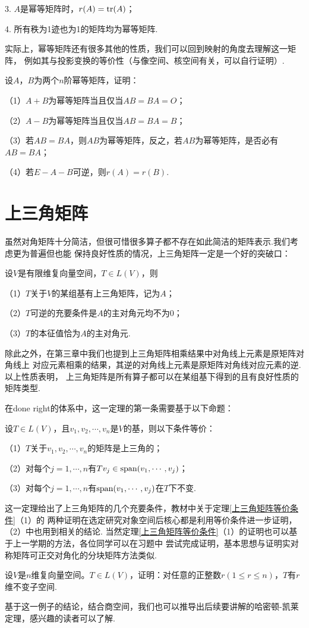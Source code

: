 3. $A$是幂等矩阵时，$r(A)=\textup{tr}(A)$；

4. 所有秩为1迹也为1的矩阵均为幂等矩阵.

实际上，幂等矩阵还有很多其他的性质，我们可以回到映射的角度去理解这一矩阵，
例如其与投影变换的等价性（与像空间、核空间有关，可以自行证明）.
\begin{example}
	设$A$，$B$为两个$n$阶幂等矩阵，证明：

	\textup{（1）}$A+B$为幂等矩阵当且仅当$AB=BA=O$；

	\textup{（2）}$A-B$为幂等矩阵当且仅当$AB=BA=B$；

	\textup{（3）}若$AB=BA$，则$AB$为幂等矩阵，反之，若$AB$为幂等矩阵，是否必有$AB=BA$；

	\textup{（4）}若$E-A-B$可逆，则$r(A)=r(B)$.
\end{example}

\section{上三角矩阵}
虽然对角矩阵十分简洁，但很可惜很多算子都不存在如此简洁的矩阵表示.我们考虑更为普遍但也能
保持良好性质的情况，上三角矩阵一定是一个好的突破口：
\begin{theorem}\label{上三角矩阵等价条件}
	设$V$是有限维复向量空间，$T\in L(V)$，则
	
	\textup{（1）}$T$关于$V$的某组基有上三角矩阵，记为$A$；
	
	\textup{（2）}$T$可逆的充要条件是$A$的主对角元均不为$0$；
	
	\textup{（3）}$T$的本征值恰为$A$的主对角元.
\end{theorem}
除此之外，在第三章中我们也提到上三角矩阵相乘结果中对角线上元素是原矩阵对角线上
对应元素相乘的结果，其逆的对角线上元素是原矩阵对角线对应元素的逆.以上性质表明，
上三角矩阵是所有算子都可以在某组基下得到的且有良好性质的矩阵类型.

在done right的体系中，这一定理的第一条需要基于以下命题：
\begin{theorem}
	设$T\in L(V)$，且$v_1,v_2,\cdots,v_n$是$V$的基，则以下条件等价：

	\textup{（1）}$T$关于$v_1,v_2,\cdots,v_n$的矩阵是上三角的；

	\textup{（2）}对每个$j=1,\cdots,n$有$Tv_j\in\textup{span}(v_1,\cdots,v_j)$；

	\textup{（3）}对每个$j=1,\cdots,n$有$\textup{span}(v_1,\cdots,v_j)$在$T$下不变.
\end{theorem}
这一定理给出了上三角矩阵的几个充要条件，教材中关于定理\ref{上三角矩阵等价条件}（1）的
两种证明在选定研究对象空间后核心都是利用等价条件进一步证明，（2）中也用到相关的结论.
当然定理\ref{上三角矩阵等价条件}（1）的证明也可以基于上一学期的方法，各位同学可以在习题中
尝试完成证明，基本思想与证明实对称矩阵可正交对角化的分块矩阵方法类似.
\begin{example}
	设$V$是$n$维复向量空间。$T\in L(V)$，证明：对任意的正整数$r(1\le r\le n)$，$T$有$r$维不变子空间.
\end{example}
基于这一例子的结论，结合商空间，我们也可以推导出后续要讲解的哈密顿-凯莱定理，感兴趣的读者可以了解.

